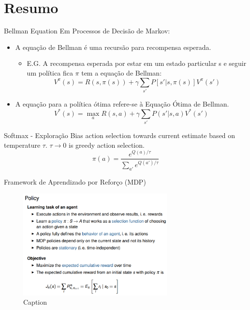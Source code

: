 \section{Resumo}

\begin{frame}{Bellman Equation}
    Em Processos de Decisão de Markov:
    \begin{itemize}
        \item A \alert{equação de Bellman é uma recursão para recompensa esperada}.
        \begin{itemize}
            \item E.G. A recompensa esperada por estar em um estado particular s e seguir um política fica $\pi$ tem a equação de Bellman:
            $$V^{\pi}(s) = R(s, \pi(s)) + \gamma \sum_{s'}{P[s'|s,\pi(s)]V^{\pi}(s')}$$
        \end{itemize}
    \end{itemize}
    
    \begin{itemize}
        \item A equação para a política ótima refere-se à \alert{Equação Ótima de Bellman}.
        $$V^*(s) = \max_{a}{R(s,a) + \gamma \sum_{s'}{P(s'|s,a)V^*(s')}}$$
    \end{itemize}
\end{frame}

\begin{frame}{Softmax - Exploração}
    Bias action selection towards current estimate based on \alert{temperature} $\tau$. $\tau \rightarrow 0$ is greedy action selection.
    $$\pi(a) = \frac{e^{Q(a)/\tau}}{\sum_{a'}{e^{Q(a')/\tau}}}$$
\end{frame}

\begin{frame}{Framework de Aprendizado por Reforço (MDP)}
    \begin{figure}
        \centering
        \includegraphics[width=0.7\textwidth]{img/policy.png}
        \caption{Caption}
        \label{fig:my_label}
    \end{figure}
\end{frame}

